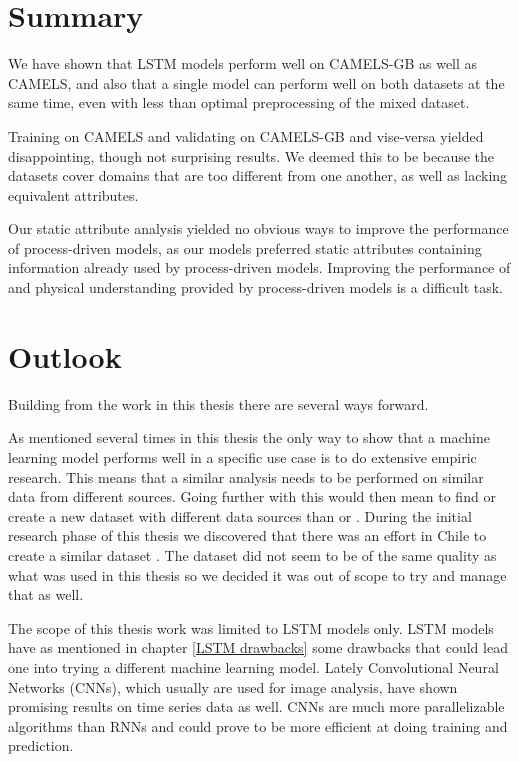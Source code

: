 \section{Summary}
We have shown that LSTM models perform well on CAMELS-GB as well as CAMELS, and 
also that a single model can perform well on both datasets at the same time, even 
with less than optimal preprocessing of the mixed dataset.

Training on CAMELS and validating on CAMELS-GB and vise-versa yielded disappointing, 
though not surprising results. We deemed this to be because the datasets cover 
domains that are too different from one another, as well as lacking equivalent 
attributes.

Our static attribute analysis yielded no obvious ways to improve the performance 
of process-driven models, as our models preferred static attributes containing 
information already used by process-driven models. Improving the performance of and 
physical understanding provided by process-driven models is a difficult task.

\section{Outlook}
Building from the work in this thesis there are several ways forward. 
    
As mentioned several times in this thesis the only way to show that a machine 
learning model performs well in a specific use case is to do extensive empiric 
research. This means that a similar analysis needs to be performed on similar data 
from different sources. Going further with this would then mean to find or create 
a new dataset with different data sources than \citet{CAMELS_GB} or \citet{CAMELS_US}. 
During the initial research phase of this thesis we discovered that there was an 
effort in Chile to create a similar dataset \citep{CAMELS_CL}. The dataset did 
not seem to be of the same quality as what was used in this thesis so we decided 
it was out of scope to try and manage that as well.

The scope of this thesis work was limited to LSTM models only. LSTM models have 
as mentioned in chapter \ref{LSTM drawbacks} some drawbacks that could lead one 
into trying a different machine learning model. Lately Convolutional Neural Networks 
(CNNs), which usually are used for image analysis, have shown promising results 
on time series data as well. \citationneeded CNNs are much more parallelizable 
algorithms than RNNs \citationneeded and could prove to be more efficient at doing 
training and prediction.

